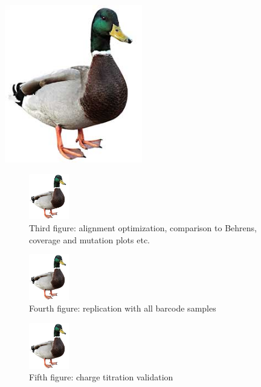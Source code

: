 \documentclass[9pt,lineno]{elife}
\begin{document}
{\includegraphics[width=6cm]{figures/duck.jpg}}\label{figsupp:sfig2_2}






\begin{figure}[ht!]
\centering
\includegraphics[height=2cm]{figures/duck.jpg}
\caption{
Third figure: alignment optimization, comparison to Behrens, coverage and mutation plots etc.
}
\label{fig:fig3}
\end{figure}





\begin{figure}[ht!]
\centering
\includegraphics[height=2cm]{figures/duck.jpg}
\caption{
Fourth figure: replication with all barcode samples
}
\label{fig:fig4}
\end{figure}


\begin{figure}[ht!]
\centering
\includegraphics[height=2cm]{figures/duck.jpg}
\caption{
Fifth figure: charge titration validation
}
\label{fig:fig5}
\end{figure}
\end{document}
